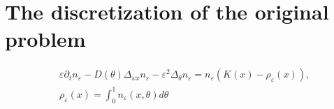 \documentclass[11pt, dina4, amsfont12]{article}
\begin{document}
\section{The discretization of the original problem}
\begin{equation}
\begin{aligned}
&\varepsilon \partial_t n_\varepsilon - D(\theta)\Delta_{xx}n_\varepsilon -\varepsilon^2\Delta_\theta n_\varepsilon = n_\varepsilon(K(x) - \rho_\varepsilon (x)),\\
&\rho_\varepsilon(x) = \int_0^1 n_\varepsilon(x,\theta) d\theta 
\end{aligned}
\end{equation}
\end{document}
